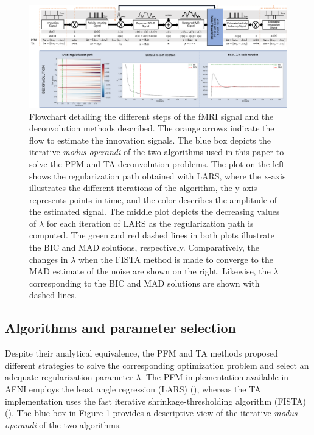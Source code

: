 \begin{figure}[t!]
    \begin{center}
        \includegraphics[width=\columnwidth]{figures/flowchart.pdf}
    \end{center}
    \caption{Flowchart detailing the different steps of the fMRI signal and the deconvolution methods described. The orange arrows indicate the flow to estimate the innovation signals. The blue box depicts the iterative \textit{modus operandi} of the two algorithms used in this paper to solve the PFM and TA deconvolution problems. The plot on the left shows the regularization path obtained with LARS, where the x-axis illustrates the different iterations of the algorithm, the y-axis represents points in time, and the color describes the amplitude of the estimated signal. The middle plot depicts the decreasing values of $\lambda$ for each iteration of LARS as the regularization path is computed. The green and red dashed lines in both plots illustrate the BIC and MAD solutions, respectively. Comparatively, the changes in $\lambda$ when the FISTA method is made to converge to the MAD estimate of the noise are shown on the right. Likewise, the $\lambda$ corresponding to the BIC and MAD solutions are shown with dashed lines.}
\label{fig:flowchart}
\end{figure}

\subsection{Algorithms and parameter selection}
\label{sec:regparam}
Despite their analytical equivalence, the PFM and TA methods proposed different strategies to solve the corresponding optimization problem and select an adequate regularization parameter $\lambda$. The PFM implementation available in AFNI employs the least angle regression (LARS) (\citealt{Efron2004Leastangleregression}), whereas the TA implementation uses the fast iterative shrinkage-thresholding algorithm (FISTA) (\citealt{Beck2009FastIterativeShrinkage}). The blue box in Figure \ref{fig:flowchart} provides a descriptive view of the iterative \textit{modus operandi} of the two algorithms.

